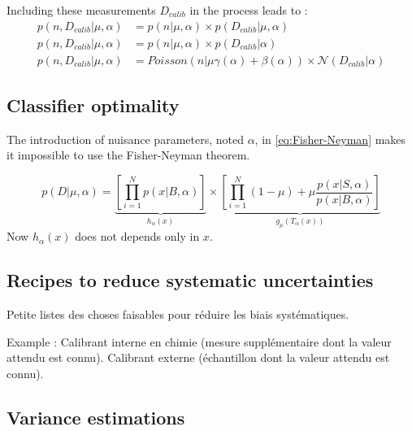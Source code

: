Including these measurements $D_{calib}$ in the process leads to :
\begin{align}
	p(n, D_{calib} | \mu, \alpha) &= p(n | \mu, \alpha) \times p(D_{calib} | \mu, \alpha) \\
	p(n, D_{calib} | \mu, \alpha) &= p(n | \mu, \alpha) \times p(D_{calib} | \alpha) \\
	p(n, D_{calib} | \mu, \alpha) &= Poisson(n | \mu \gamma(\alpha) +\beta(\alpha)) \times \mathcal N(D_{calib} | \alpha)
\end{align}



\subsection{Classifier optimality} %
\label{sub:classifier_optimality}


The introduction of nuisance parameters, noted $\alpha$, in \autoref{eq:Fisher-Neyman} makes it impossible to use the Fisher-Neyman theorem.

\begin{equation}
	p(D|\mu, \alpha) = \underbrace{\left[ \prod_{i=1}^N p(x|B, \alpha) \right ]}_{h_\alpha(x)} \times 
       \underbrace{\left [\prod_{i=1}^N (1-\mu) + \mu \frac{p(x|S, \alpha)}{p(x|B, \alpha)} \right ]}_{g_\mu(T_\alpha(x))}
\end{equation}
Now $h_\alpha(x)$ does not depends only in $x$.






\subsection{Recipes to reduce systematic uncertainties} %
\label{sub:recipes_to_reduce_systematic_unceratinties}


Petite listes des choses faisables pour réduire les biais systématiques. 


Example : Calibrant interne en chimie (mesure supplémentaire dont la valeur attendu est connu). Calibrant externe (échantillon dont la valeur attendu est connu).








\subsection{Variance estimations} %
\label{sub:variance_estimations}

